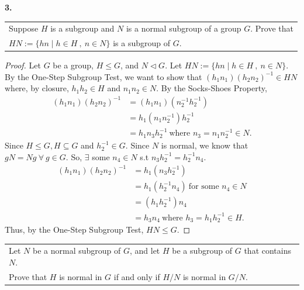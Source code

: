 \documentclass[12pt, letterpaper]{article}
\begin{document}
\noindent \textbf{3.} \  \begin{tabular}[t]{l}
     Suppose $H$ is a subgroup and $N$ is a normal subgroup of a group $G$. Prove that \\
     $HN := \{hn  \mid h \in H \ , \ n \in N \}$ is a subgroup of $G$.
\end{tabular}
\begin{proof}
    Let $G$ be a group, $H \leq G$, and $N \lhd G$. Let $HN := \{hn  \mid h \in H \ , \ n \in N \}$. By the One-Step Subgroup Test, we want to show that $(h_1n_1)(h_2n_2)^{-1} \in HN$ where, by closure, $h_1h_2 \in H$ and $n_1n_2 \in N$. By the Socks-Shoes Property,
    \begin{align*}
        (h_1n_1)(h_2n_2)^{-1} &= (h_1n_1)(n_2^{-1}h_2^{-1}) \\
        &= h_1(n_1n_2^{-1})h_{2}^{-1} \\
        &= h_1n_3h_2^{-1} \ \text{where $n_3 = n_1n_2^{-1} \in N$}. 
    \end{align*}
    Since $H \leq G, H \subseteq G$ and $h_2^{-1} \in G$. Since $N$ is normal, we know that $gN = Ng \ \forall \ g \in G$. So, $\exists$ some $n_4 \in N$ s.t $n_3h_2^{-1} = h_2^{-1}n_4$.
    \begin{align*}
        (h_1n_1)(h_2n_2)^{-1} &= h_1(n_3h_2^{-1}) \\
        &= h_1(h_2^{-1}n_4) \ \text{for some $n_4 \in N$} \\
        &= (h_1h_2^{-1})n_4 \\
        &= h_3n_4 \ \text{where $h_3 = h_1h_2^{-1} \in H$}.
    \end{align*}
 Thus, by the One-Step Subgroup Test, $HN \leq G$.
\end{proof} \vspace{0.2em}
 \begin{tabular}[t]{l}
     Let $N$ be a normal subgroup of $G$, and let $H$ be a subgroup of $G$ that contains $N$. \\ Prove that $H$ is normal in $G$ if and only if $H/N$ is normal in $G/N$.
\end{tabular}
\end{document}

